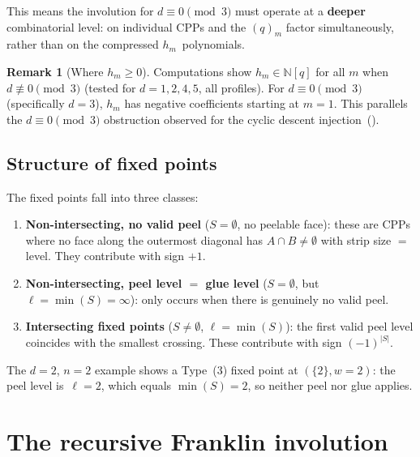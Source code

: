 \documentclass[11pt]{article}
\newcommand{\N}{\mathbb{N}}
\theoremstyle{plain}
\theoremstyle{definition}
\newtheorem{remark}[theorem]{Remark}
\begin{document}
This means the involution for $d \equiv 0 \pmod{3}$ must
operate at a \textbf{deeper} combinatorial level: on
individual CPPs and the $(q)_m$ factor
simultaneously, rather than on the compressed
$h_m$~polynomials.

\begin{remark}[Where $h_m \geq 0$]
\label{rem:h-nonneg}
Computations show $h_m \in \N[q]$ for all $m$ when
$d \not\equiv 0 \pmod{3}$ (tested for $d = 1, 2, 4, 5$,
all profiles).  For $d \equiv 0 \pmod{3}$
(specifically $d = 3$), $h_m$ has negative coefficients
starting at $m = 1$.  This parallels the $d \equiv 0
\pmod{3}$ obstruction observed for the cyclic descent
injection~(\cite{LOCAL_RULE}).
\end{remark}


\subsection{Structure of fixed points}

The fixed points fall into three classes:

\begin{enumerate}
  \item \textbf{Non-intersecting, no valid peel}
    ($S = \emptyset$, no peelable face):
    these are CPPs where no face along the outermost
    diagonal has $A \cap B \neq \emptyset$ with strip
    size $= $ level.  They contribute with sign $+1$.

  \item \textbf{Non-intersecting, peel level $= $ glue
    level} ($S = \emptyset$, but
    $\ell = \min(S) = \infty$): only occurs when there is
    genuinely no valid peel.

  \item \textbf{Intersecting fixed points}
    ($S \neq \emptyset$, $\ell = \min(S)$): the first
    valid peel level coincides with the smallest crossing.
    These contribute with sign $(-1)^{|S|}$.
\end{enumerate}

The $d = 2$, $n = 2$ example shows a Type~(3) fixed
point at $(\{2\}, w{=}2)$: the peel level is~$\ell = 2$,
which equals $\min(S) = 2$, so neither peel nor glue
applies.


\section{The recursive Franklin involution}
\label{sec:recursive}
\end{document}
